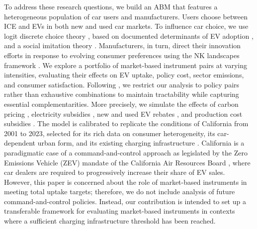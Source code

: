 \documentclass[12pt]{article}
\begin{document}
To address these research questions, we build an ABM that features a heterogeneous population of car users and manufacturers. Users choose between ICE and EVs in both new and used car markets. To influence car choice, we use logit discrete choice theory \citep{McFadden1974}, based on documented determinants of EV adoption \citep{singh_review_2020,pandita2024electrifying}, and a social imitation theory \citep{rogers2003diffusion}. Manufacturers, in turn, direct their innovation efforts in response to evolving consumer preferences \citep{windrum2009consumer} using the NK landscapes framework \citep{kauffman1993origins,levinthal1997adaptation}. We explore a portfolio of market-based instrument pairs at varying intensities, evaluating their effects on EV uptake, policy cost, sector emissions, and consumer satisfaction. Following \citet{van2021designing}, we restrict our analysis to policy pairs rather than exhaustive combinations to maintain tractability while capturing essential complementarities. More precisely, we simulate the effects of carbon pricing \citep{Hardman2019Understanding}, electricity subsidies \citep{Kwon2018Evaluation}, new and used EV rebates \citep{Lodhia2024Assessment}, and production cost subsidies \citep{OECD2025Subsidies}. The model is calibrated to replicate the conditions of California from 2001 to 2023, selected for its rich data on consumer heterogeneity, its car-dependent urban form, and its existing charging infrastructure \citep{borlaug_public_2023}. California is a paradigmatic case of a command-and-control approach as legislated by the Zero Emissions Vehicle (ZEV) mandate of the California Air Resources Board \citep{wesseling2015exploring}, where car dealers are required to progressively increase their share of EV sales. However, this paper is concerned about the role of market-based instruments in meeting total uptake targets; therefore, we do not include analysis of future command-and-control policies. Instead, our contribution is intended to set up a transferable framework for evaluating market-based instruments in contexts where a sufficient charging infrastructure threshold has been reached.
\end{document}
